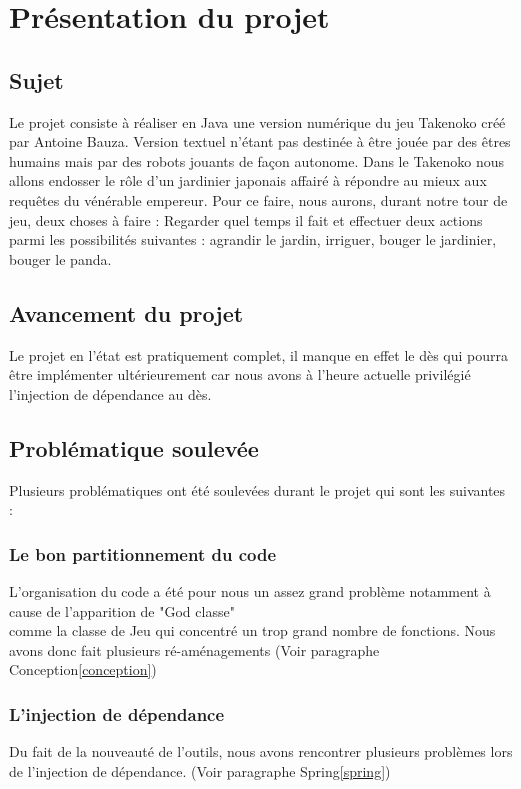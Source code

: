 

\chapter{Présentation du projet}


\section{Sujet}
Le projet consiste à réaliser en Java une version numérique du jeu Takenoko créé par Antoine Bauza. Version textuel n'étant pas destinée à être jouée par des êtres humains mais par des robots jouants de façon autonome. Dans le Takenoko nous allons endosser le rôle d'un jardinier japonais affairé à répondre au mieux aux requêtes du vénérable empereur. Pour ce faire, nous aurons, durant notre tour de jeu, deux choses à faire : Regarder quel temps il fait et effectuer deux actions parmi les possibilités suivantes : agrandir le jardin, irriguer, bouger le jardinier, bouger le panda. 

\section{Avancement du projet}
Le projet en l'état est pratiquement complet, il manque en effet le dès qui pourra être implémenter ultérieurement car nous avons à l'heure actuelle privilégié l'injection de dépendance au dès.  

\section{Problématique soulevée}
Plusieurs problématiques ont été soulevées durant le projet qui sont les suivantes :

\subsection{Le bon partitionnement du code}
L'organisation du code a été pour nous un assez grand problème notamment à cause de l'apparition de "God classe"\footnotemark\\ comme la classe de Jeu qui concentré un trop grand nombre de fonctions. Nous avons donc fait plusieurs ré-aménagements (Voir paragraphe Conception\ref{conception}) 

{}

\subsection{L'injection de dépendance}

Du fait de la nouveauté de l'outils, nous avons rencontrer plusieurs problèmes lors de l'injection de dépendance. (Voir paragraphe Spring\ref{spring})
